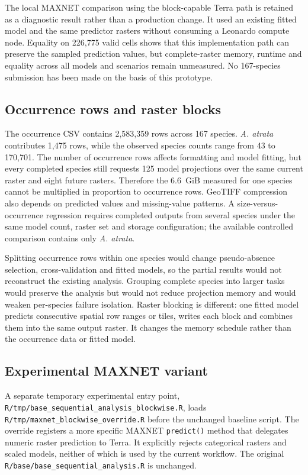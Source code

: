 The local MAXNET comparison using the block-capable Terra path is retained as a diagnostic result rather than a production change. It used an existing fitted model and the same predictor rasters without consuming a Leonardo compute node. Equality on 226,775 valid cells shows that this implementation path can preserve the sampled prediction values, but complete-raster memory, runtime and equality across all models and scenarios remain unmeasured. No 167-species submission has been made on the basis of this prototype.

\subsection{Occurrence rows and raster blocks}

The occurrence CSV contains 2,583,359 rows across 167 species. \emph{A. atrata} contributes 1,475 rows, while the observed species counts range from 43 to 170,701. The number of occurrence rows affects formatting and model fitting, but every completed species still requests 125 model projections over the same current raster and eight future rasters. Therefore the 6.6~GiB measured for one species cannot be multiplied in proportion to occurrence rows. GeoTIFF compression also depends on predicted values and missing-value patterns. A size-versus-occurrence regression requires completed outputs from several species under the same model count, raster set and storage configuration; the available controlled comparison contains only \emph{A. atrata}.

Splitting occurrence rows within one species would change pseudo-absence selection, cross-validation and fitted models, so the partial results would not reconstruct the existing analysis. Grouping complete species into larger tasks would preserve the analysis but would not reduce projection memory and would weaken per-species failure isolation. Raster blocking is different: one fitted model predicts consecutive spatial row ranges or tiles, writes each block and combines them into the same output raster. It changes the memory schedule rather than the occurrence data or fitted model.

\subsection{Experimental MAXNET variant}

A separate temporary experimental entry point, \nolinkurl{R/tmp/base_sequential_analysis_blockwise.R}, loads \nolinkurl{R/tmp/maxnet_blockwise_override.R} before the unchanged baseline script. The override registers a more specific MAXNET \texttt{predict()} method that delegates numeric raster prediction to Terra. It explicitly rejects categorical rasters and scaled models, neither of which is used by the current workflow. The original \nolinkurl{R/base/base_sequential_analysis.R} is unchanged.

